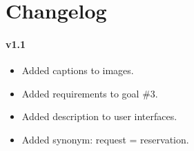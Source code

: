 \chapter*{Changelog}
\subsubsection{v1.1}
\begin{itemize}
\item Added captions to images.
\item Added requirements to goal \#3.
\item Added description to user interfaces.
\item Added synonym: request = reservation.
\end{itemize}
